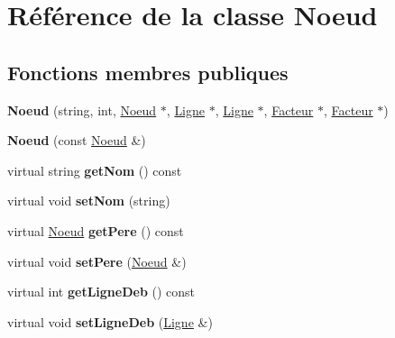 \hypertarget{classNoeud}{
\section{Référence de la classe Noeud}
\label{classNoeud}
}
\subsection*{Fonctions membres publiques}
\begin{DoxyCompactItemize}
\item 
\hypertarget{classNoeud_a199d747ffdace90b638e389d248dab5f}{
{\bfseries Noeud} (string, int, \hyperlink{classNoeud}{Noeud} $\ast$, \hyperlink{classLigne}{Ligne} $\ast$, \hyperlink{classLigne}{Ligne} $\ast$, \hyperlink{classFacteur}{Facteur} $\ast$, \hyperlink{classFacteur}{Facteur} $\ast$)}
\label{classNoeud_a199d747ffdace90b638e389d248dab5f}

\item 
\hypertarget{classNoeud_a6ef8adab9b819f46787eb30a8bae2e77}{
{\bfseries Noeud} (const \hyperlink{classNoeud}{Noeud} \&)}
\label{classNoeud_a6ef8adab9b819f46787eb30a8bae2e77}

\item 
\hypertarget{classNoeud_ac6efbbb2f6ce5260eb741de6ac4a4570}{
virtual string {\bfseries getNom} () const }
\label{classNoeud_ac6efbbb2f6ce5260eb741de6ac4a4570}

\item 
\hypertarget{classNoeud_a784ac2c752bbf779691495bd706c9dff}{
virtual void {\bfseries setNom} (string)}
\label{classNoeud_a784ac2c752bbf779691495bd706c9dff}

\item 
\hypertarget{classNoeud_a9ebc25e8e9dcc74db5f2de96d135e937}{
virtual \hyperlink{classNoeud}{Noeud} {\bfseries getPere} () const }
\label{classNoeud_a9ebc25e8e9dcc74db5f2de96d135e937}

\item 
\hypertarget{classNoeud_af918c7824da22b70229a8a8b39eaa416}{
virtual void {\bfseries setPere} (\hyperlink{classNoeud}{Noeud} \&)}
\label{classNoeud_af918c7824da22b70229a8a8b39eaa416}

\item 
\hypertarget{classNoeud_aa8695f78b8fab2cc333fdedec96d1fcd}{
virtual int {\bfseries getLigneDeb} () const }
\label{classNoeud_aa8695f78b8fab2cc333fdedec96d1fcd}

\item 
\hypertarget{classNoeud_ae5f55210bbb26e61a94359142da71529}{
virtual void {\bfseries setLigneDeb} (\hyperlink{classLigne}{Ligne} \&)}
\label{classNoeud_ae5f55210bbb26e61a94359142da71529}


\end{DoxyCompactItemize}
